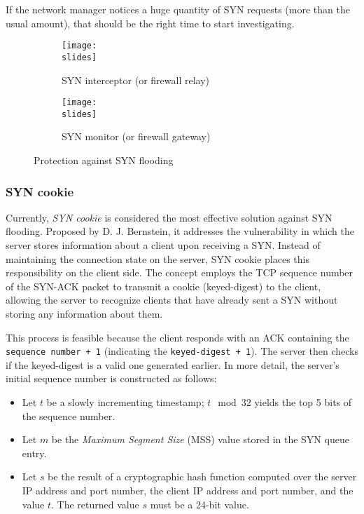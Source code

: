 If the network manager notices a huge quantity of SYN requests (more than the usual amount), that should be the right time to start investigating.

\begin{figure}[h]
    \centering
    \begin{subfigure}{0.49\textwidth}
        \texttt{[image: \\slides]}
        \caption{SYN interceptor (or firewall relay)}
        \label{fig:SYN-interceptor}
    \end{subfigure}
    \hfill
    \begin{subfigure}{0.49\textwidth}
        \texttt{[image: \\slides]}
        \caption{SYN monitor (or firewall gateway)}
        \label{fig:SYN-monitor}
    \end{subfigure}
    \caption{Protection against SYN flooding}
\end{figure}


\subsubsection{SYN cookie}
Currently, \textit{SYN cookie} is considered the most effective solution against SYN flooding. Proposed by D. J. Bernstein, it addresses the vulnerability in which the server stores information about a client upon receiving a SYN. Instead of maintaining the connection state on the server, SYN cookie places this responsibility on the client side. The concept employs the TCP sequence number of the SYN-ACK packet to transmit a cookie (keyed-digest) to the client, allowing the server to recognize clients that have already sent a SYN without storing any information about them.

This process is feasible because the client responds with an ACK containing the \texttt{sequence number + 1} (indicating the \texttt{keyed-digest + 1}). The server then checks if the keyed-digest is a valid one generated earlier. In more detail, the server's initial sequence number is constructed as follows:

\begin{itemize}
    \item Let $t$ be a slowly incrementing timestamp; $t \mod 32$ yields the top 5 bits of the sequence number.
    \item Let $m$ be the \textit{Maximum Segment Size} (MSS) value stored in the SYN queue entry.
    \item Let $s$ be the result of a cryptographic hash function computed over the server IP address and port number, the client IP address and port number, and the value $t$. The returned value $s$ must be a 24-bit value.
\end{itemize}

